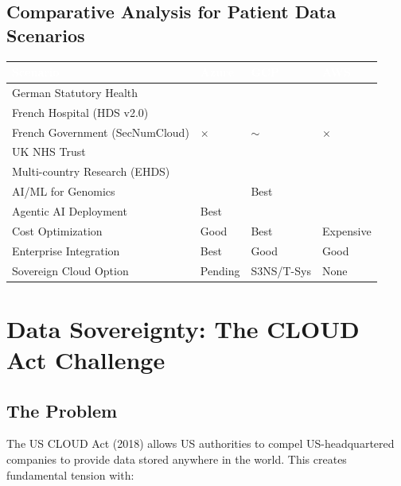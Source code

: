 \documentclass[11pt,a4paper]{article}
\newcommand{\compliant}{\textcolor{msgreen}{\checkmark}}
\newcommand{\partialcompliant}{\textcolor{msorange}{$\sim$}}
\newcommand{\notcompliant}{\textcolor{msred}{$\times$}}
\begin{document}
\subsection{Comparative Analysis for Patient Data Scenarios}

\begin{center}
\begin{tabular}{L{4cm}C{2cm}C{2cm}C{2cm}}
\toprule
{}
\textcolor{white}{\textbf{Scenario}} & \textcolor{white}{\textbf{Azure}} & \textcolor{white}{\textbf{GCP}} & \textcolor{white}{\textbf{AWS}} \\
\midrule
German Statutory Health & \compliant & \compliant & \compliant \\
French Hospital (HDS v2.0) & \compliant & \compliant & \compliant \\
French Government (SecNumCloud) & \notcompliant & \partialcompliant & \notcompliant \\
UK NHS Trust & \compliant & \compliant & \compliant \\
Multi-country Research (EHDS) & \compliant & \compliant & \compliant \\
AI/ML for Genomics & \compliant & \compliant{} Best & \compliant \\
Agentic AI Deployment & \compliant{} Best & \compliant & \compliant \\
Cost Optimization & Good & Best & Expensive \\
Enterprise Integration & Best & Good & Good \\
Sovereign Cloud Option & Pending & S3NS/T-Sys & None \\
\bottomrule
\end{tabular}
\end{center}

\section{Data Sovereignty: The CLOUD Act Challenge}

\subsection{The Problem}

The US CLOUD Act (2018) allows US authorities to compel US-headquartered companies to provide data stored anywhere in the world. This creates fundamental tension with:
\end{document}
